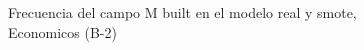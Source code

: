 \begin{figure}[H]
    \centering
    
    \caption{Frecuencia del campo M built en el modelo real y smote, Economicos (B-2)}
    \label{frecuency-M Built-smote-enc}
\end{figure}